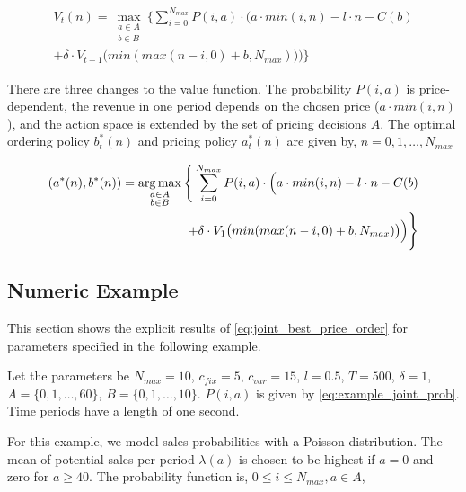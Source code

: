\begin{equation}
\begin{split}
V_t(n) = \max_{\substack{a \in A \\ b \in B}} \Bigg\{
\sum_{i = 0}^{N_{max}}
P(i, a) \cdot \Big(
a \cdot min(i, n) %
- l \cdot n %
- C(b) %
 \\
+ \delta \cdot V_{t+1}\big(min(max(n - i, 0) + b, N_{max})\big)
\Big)\Bigg\}
\end{split}
\label{eq:dyn_prog_joint}
\end{equation}

There are three changes to the value function.
The probability $P(i, a)$ is price-dependent, the revenue in one period depends on the chosen price ($a \cdot min(i, n)$), and the action space is extended by the set of pricing decisions $A$.
The optimal ordering policy $b^*_t(n)$ and pricing policy $a^*_t(n)$ are given by, $n=0,1,\ldots,N_{max}$

\begin{equation}
\begin{split}
(a^*(n), b^*(n)) = \argmax_{\substack{a \in A \\ b \in B}} \Bigg\{
\sum_{i = 0}^{N_{max}}
P(i, a) \cdot \Big(
a \cdot min(i, n) %
- l \cdot n %
- C(b) %
 \\
+ \delta \cdot V_{1}\big(min(max(n - i, 0) + b, N_{max})\big)
\Big)\Bigg\}
\end{split}
\label{eq:joint_best_price_order}
\end{equation}


\subsection{Numeric Example}
\label{section:joint_example}
This section shows the explicit results of \cref{eq:joint_best_price_order} for parameters specified in the following example.

\begin{example}
Let the parameters be $N_{max} = 10$, $c_{fix} = 5$, $c_{var} = 15$, $l = 0.5$,
$T = 500$, $\delta = 1$, $A = \{0, 1, \ldots, 60\}$, $B = \{0, 1, \ldots, 10\}$.
$P(i, a)$ is given by \cref{eq:example_joint_prob}.
Time periods have a length of one second.
\label{example:joint}
\end{example}

For this example, we model sales probabilities with a Poisson distribution.
The mean of potential sales per period $\lambda(a)$ is chosen to be highest if $a = 0$ and zero for $a \geq 40$.
The probability function is, $0 \leq i \leq N_{max}, a \in A$,

